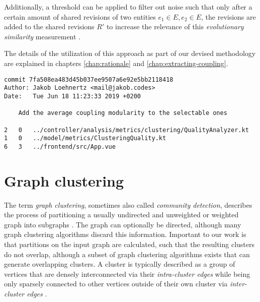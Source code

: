 \documentclass[12pt,a4paper]{report}
\begin{document}
Additionally, a threshold can be applied to filter out noise such that only
after a certain amount of shared revisions of two entities \(e_1 \in E, e_2 \in
E\), the revisions are added to the shared revisions \(R'\) to increase the
relevance of this \textit{evolutionary similarity} measurement
\cite{tornhill2015crimescene}.

The details of the utilization of this approach as part of our devised
methodology are explained in chapters \ref{chap:rationale} and
\ref{chap:extracting-coupling}.

\begin{lstlisting}[caption=Example Git log, label=git-log, breaklines=true]
commit 7fa508ea483d45b037ee9507a6e92e5bb2118418
Author: Jakob Loehnertz <mail@jakob.codes>
Date:   Tue Jun 18 11:23:33 2019 +0200

    Add the average coupling modularity to the selectable ones

2   0   ../controller/analysis/metrics/clustering/QualityAnalyzer.kt
1   0   ../model/metrics/ClusteringQuality.kt
6   3   ../frontend/src/App.vue
\end{lstlisting}



\section{Graph clustering} \label{sect:background-graph-clustering}

The term \textit{graph clustering}, sometimes also called \textit{community
detection}, describes the process of partitioning a usually undirected and
unweighted or weighted graph into subgraphs \cite{lancichinetti2009community}.
The graph can optionally be directed, although many graph clustering algorithms
discard this information. Important to our work is that partitions on the input
graph are calculated, such that the resulting clusters do not overlap, although
a subset of graph clustering algorithms exists that can generate overlapping
clusters. A cluster is typically described as a group of vertices that are
densely interconnected via their \textit{intra-cluster edges} while being only
sparsely connected to other vertices outside of their own cluster via \textit{
inter-cluster edges} \cite{lancichinetti2009community, newman2004fast}.
\end{document}
